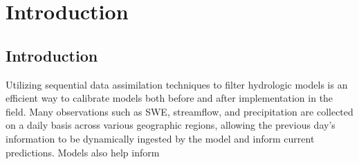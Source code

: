 \chapter{Introduction}

\section{Introduction}

	Utilizing sequential data assimilation techniques to filter hydrologic models is an efficient way to calibrate models both before and after implementation in the field. Many observations such as SWE, streamflow, and precipitation are collected on a daily basis across various geographic regions, allowing the previous day's information to be dynamically ingested by the model and inform current predictions. Models also help inform 